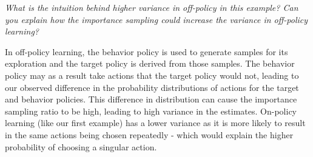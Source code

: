\documentclass{article}
\begin{document}
\textit{What is the intuition behind higher variance in off-policy in this example? Can you explain how the importance sampling could increase the variance in off-policy learning?}


In off-policy learning, the behavior policy is used to generate samples for its exploration and the target policy is derived from those samples. The behavior policy may as a result take actions that the target policy would not, leading to our observed difference in the probability distributions of actions for the target and behavior policies. This difference in distribution can cause the importance sampling ratio to be high, leading to high variance in the estimates. On-policy learning (like our first example) has a lower variance as it is more likely to result in the same actions being chosen repeatedly - which would explain the higher probability of choosing a singular action.
\end{document}
